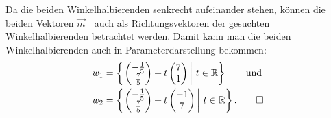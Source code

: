 \begin{loesung}
Da die
beiden Winkelhalbierenden senkrecht aufeinander stehen, können die beiden
Vektoren $\vec m_{\pm}$ auch als Richtungsvektoren der gesuchten Winkelhalbierenden
betrachtet werden. Damit kann man die beiden Winkelhalbierenden auch in
Parameterdarstellung bekommen:
\begin{align*}
w_1&=\left\{
\left.
\begin{pmatrix}-\frac15\\\frac75\end{pmatrix}+t\begin{pmatrix}7\\1\end{pmatrix}
\,
\right|\,t\in\mathbb R
\right\}\qquad\text{und}
\\
w_2&=\left\{
\left.
\begin{pmatrix}-\frac15\\\frac75\end{pmatrix}+t\begin{pmatrix}-1\\7\end{pmatrix}
\,
\right|\,t\in\mathbb R
\right\}.
\qedhere
\end{align*}
\end{loesung}

